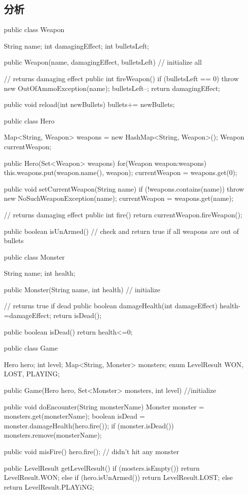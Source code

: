 \subsection{分析}
\begin{Code}
	public class Weapon{ 
		String name;
		int damagingEffect; 
		int bulletsLeft;
		
		public Weapon(name, damagingEffect, bulletsLeft) {// initialize all}
		
		// returns damaging effect
		public int fireWeapon() {
			if (bulletsLeft == 0) {
				throw new OutOfAmmoException(name);
			}
			bulletsLeft--;
			return damagingEffect;
		}
		
		public void reload(int newBullets) {
			bullets+= newBullets;
		}
	}
	
	public class Hero {
		Map<String, Weapon> weapons = new HashMap<String, Weapon>();
		Weapon currentWeapon;
		
		public Hero(Set<Weapon> weapons) {
			for(Weapon weapon:weapons) 
			this.weapons.put(weapon.name(), weapon);
			currentWeapon = weapons.get(0);
		}       
		
		public void setCurrentWeapon(String name) {
			if (!weapons.contains(name)) {
				throw new NoSuchWeaponException(name);
			}
			currentWeapon = weapons.get(name);
		}
		
		// returns damaging effect
		public int fire() {
			return currentWeapon.fireWeapon();
		}
		
		public boolean isUnArmed() {
			// check and return true if all weapons are out of bullets
		}
	}
	
	public class Monster {
		String name;
		int health;
		
		public Monster(String name, int health) {// initialize}
		
		// returns true if dead
		public boolean damageHealth(int damageEffect) {
			health-=damageEffect;
			return isDead();
		}
		
		public boolean isDead() { 
			return health<=0;
		} 
	}
	
	public class Game {
		Hero hero;
		int level;
		Map<String, Monster> monsters;
		enum LevelResult {WON, LOST, PLAYING};
		
		public Game(Hero hero, Set<Monster> monsters, int level) {//initialize}
		
		public void doEncounter(String monsterName) {
			Monster monster = monsters.get(monsterName);
			boolean isDead = monster.damageHealth(hero.fire());
			if (monster.isDead()) {
				monsters.remove(monsterName);
			}
		} 
		
		public void misFire() {
			hero.fire(); // didn't hit any monster
		}
		
		public LevelResult getLevelResult() {
			if (mosters.isEmpty()) { 
				return LevelResult.WON;
			} else if (hero.isUnArmed()) {
			return LevelResult.LOST;
			} else {
				return LevelResult.PLAYiNG;
			}
		}
	}
\end{Code}

